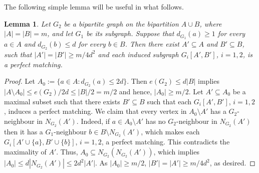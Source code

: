 \documentclass[11pt,english]{article}
\theoremstyle{plain}
\newtheorem{lem}[thm]{Lemma}
\theoremstyle{definition}
\theoremstyle{remark}
\begin{document}
    The following simple lemma will be useful in what follows.
    \begin{lem} \label{obs:induced-matching}
        Let $G_2$ be a bipartite graph on the bipartition $A\cup B$, where $|A| = |B| = m$, and let $G_1$ be its subgraph. Suppose that $d_{G_1}(a) \ge 1$ for every $a \in A$ and $d_{G_2}(b) \le d$ for every $b \in B$.
        Then there exist $A' \subseteq A$ and $B' \subseteq B$, such that $|A'| = |B'| \ge m/4d^2$ and each induced subgraph $G_i[A', B']$, $i=1,2$, is a perfect matching. 
    \end{lem}%
    \begin{proof}
        Let $A_0 := \{a \in A: d_{G_2}(a) \le 2d\}$. Then $e(G_2) \le d|B|$ implies $|A \setminus A_0| \le e(G_2)/2d \le |B|/2 = m/2$ and hence, $|A_0| \ge m/2$.
        Let $A' \subseteq A_0$ be a maximal subset such that there exists $B' \subseteq B$ such that each $G_i[A', B']$, $i=1,2$, induces a perfect matching. We claim that every vertex in $A_0 \setminus A'$ has a $G_2$-neighbour in $N_{G_2}(A')$. Indeed, if $a \in A_0 \setminus A'$ has no $G_2$-neighbour in $N_{G_2}(A')$ then it has a $G_1$-neighbour $b \in B \setminus N_{G_2}(A')$, which makes each $G_i[A' \cup \{a\}, B' \cup \{b\}]$, $i=1,2$, a perfect matching. This contradicts the maximality of $A'$.
        Thus, $A_0 \subseteq N_{G_2}(N_{G_2}(A'))$, which implies $|A_0| \le d |N_{G_2}(A')| \le 2d^2|A'|$. As $|A_0| \ge m/2$, $|B'| = |A'| \ge m/4d^2$, as desired.
    \end{proof}
    
\end{document}
